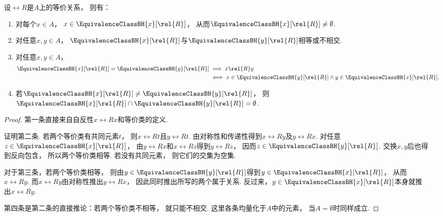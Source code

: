 \begin{property}
    设\(\rel{R}\)是\(A\)上的等价关系，
    则有：
    \begin{enumerate}
        \item 对每个\(x\in A\)，
        \(x\in\EquivalenceClassBH{x}[\rel{R}]\)，
        从而\(\EquivalenceClassBH{x}[\rel{R}]\neq\emptyset\).
        \item 对任意\(x,y\in A\)，
        \(\EquivalenceClassBH{x}[\rel{R}]\)与\(\EquivalenceClassBH{y}[\rel{R}]\)相等或不相交.
        \item 对任意\(x,y\in A\)，
        \begin{align*}
            \EquivalenceClassBH{x}[\rel{R}]=\EquivalenceClassBH{y}[\rel{R}]
            &\implies x\rel{R}y\\
            &\iff x\in\EquivalenceClassBH{y}[\rel{R}]
            \land y\in\EquivalenceClassBH{x}[\rel{R}].
        \end{align*}
        \item 若\(\EquivalenceClassBH{x}[\rel{R}]\neq\EquivalenceClassBH{y}[\rel{R}]\)，
        则\(\EquivalenceClassBH{x}[\rel{R}]\cap\EquivalenceClassBH{y}[\rel{R}]=\emptyset\).
    \end{enumerate}
    \begin{proof}
        第一条直接来自自反性\(x\rel{R}x\)和等价类的定义.

        证明第二条.
        若两个等价类有共同元素\(t\)，
        则\(x\rel{R}t\)且\(y\rel{R}t\).
        由对称性和传递性得到\(x\rel{R}y\)及\(y\rel{R}x\).
        对任意\(z\in\EquivalenceClassBH{x}[\rel{R}]\)，
        由\(y\rel{R}x\)和\(x\rel{R}z\)得到\(y\rel{R}z\)，
        因而\(z\in\EquivalenceClassBH{y}[\rel{R}]\).
        交换\(x,y\)后也得到反向包含，
        所以两个等价类相等.
        若没有共同元素，
        则它们的交集为空集.

        对于第三条，若两个等价类相等，
        则由\(y\in\EquivalenceClassBH{y}[\rel{R}]\)得到\(y\in\EquivalenceClassBH{x}[\rel{R}]\)，
        从而\(x\rel{R}y\).
        而\(x\rel{R}y\)由对称性推出\(y\rel{R}x\)，
        因此同时推出所写的两个属于关系.
        反过来，\(y\in\EquivalenceClassBH{x}[\rel{R}]\)本身就推出\(x\rel{R}y\).

        第四条是第二条的直接推论：若两个等价类不相等，
        就只能不相交.
        这里各条均量化于\(A\)中的元素，
        当\(A=\emptyset\)时同样成立.
    \end{proof}
\end{property}

